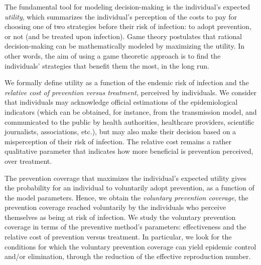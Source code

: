 The fundamental tool for modeling decision-making is the individual's expected {\it utility}, which summarizes the individual's perception of the costs to pay for choosing one of two strategies before their risk of infection: to adopt prevention, or not (and be treated upon infection). Game theory postulates that rational decision-making can be mathematically modeled by maximizing the utility. In other words, the aim of using a game theoretic approach is to find the individuals' strategies that benefit them the most, in the long run. 

We formally define utility as a function of the endemic risk of infection and the {\it relative cost of prevention versus treatment}, perceived by individuals. We consider that individuals may acknowledge official estimations of the epidemiological indicators (which can be obtained, for instance, from the transmission model, and communicated to the public by health authorities, healthcare providers, scientific journalists, associations, etc.), but may also make their decision based on a misperception of their risk of infection. The relative cost remains a rather qualitative parameter that indicates how more beneficial is prevention perceived, over treatment.

The prevention coverage that maximizes the individual's expected utility gives the probability for an individual to voluntarily adopt prevention, as a function of the model parameters. Hence, we obtain the {\it voluntary prevention coverage}, the prevention coverage reached voluntarily by the individuals who perceive themselves as being at risk of infection. 
%
We study the voluntary prevention coverage in terms of the preventive method's parameters: effectiveness and the relative cost of prevention versus treatment. In particular, we look for the conditions for which the voluntary prevention coverage can yield epidemic control and/or elimination, through the reduction of the effective reproduction number.

